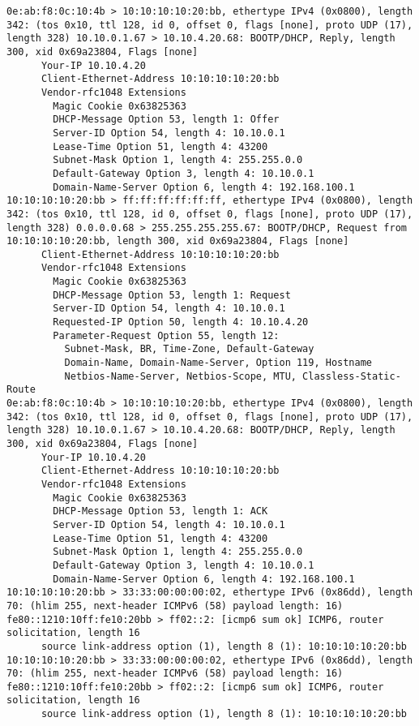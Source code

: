\documentclass[a4paper,12pt]{article}
\begin{document}
\begin{Verbatim}
0e:ab:f8:0c:10:4b > 10:10:10:10:20:bb, ethertype IPv4 (0x0800), length 342: (tos 0x10, ttl 128, id 0, offset 0, flags [none], proto UDP (17), length 328) 10.10.0.1.67 > 10.10.4.20.68: BOOTP/DHCP, Reply, length 300, xid 0x69a23804, Flags [none]
	  Your-IP 10.10.4.20
	  Client-Ethernet-Address 10:10:10:10:20:bb
	  Vendor-rfc1048 Extensions
	    Magic Cookie 0x63825363
	    DHCP-Message Option 53, length 1: Offer
	    Server-ID Option 54, length 4: 10.10.0.1
	    Lease-Time Option 51, length 4: 43200
	    Subnet-Mask Option 1, length 4: 255.255.0.0
	    Default-Gateway Option 3, length 4: 10.10.0.1
	    Domain-Name-Server Option 6, length 4: 192.168.100.1
10:10:10:10:20:bb > ff:ff:ff:ff:ff:ff, ethertype IPv4 (0x0800), length 342: (tos 0x10, ttl 128, id 0, offset 0, flags [none], proto UDP (17), length 328) 0.0.0.0.68 > 255.255.255.255.67: BOOTP/DHCP, Request from 10:10:10:10:20:bb, length 300, xid 0x69a23804, Flags [none]
	  Client-Ethernet-Address 10:10:10:10:20:bb
	  Vendor-rfc1048 Extensions
	    Magic Cookie 0x63825363
	    DHCP-Message Option 53, length 1: Request
	    Server-ID Option 54, length 4: 10.10.0.1
	    Requested-IP Option 50, length 4: 10.10.4.20
	    Parameter-Request Option 55, length 12: 
	      Subnet-Mask, BR, Time-Zone, Default-Gateway
	      Domain-Name, Domain-Name-Server, Option 119, Hostname
	      Netbios-Name-Server, Netbios-Scope, MTU, Classless-Static-Route
0e:ab:f8:0c:10:4b > 10:10:10:10:20:bb, ethertype IPv4 (0x0800), length 342: (tos 0x10, ttl 128, id 0, offset 0, flags [none], proto UDP (17), length 328) 10.10.0.1.67 > 10.10.4.20.68: BOOTP/DHCP, Reply, length 300, xid 0x69a23804, Flags [none]
	  Your-IP 10.10.4.20
	  Client-Ethernet-Address 10:10:10:10:20:bb
	  Vendor-rfc1048 Extensions
	    Magic Cookie 0x63825363
	    DHCP-Message Option 53, length 1: ACK
	    Server-ID Option 54, length 4: 10.10.0.1
	    Lease-Time Option 51, length 4: 43200
	    Subnet-Mask Option 1, length 4: 255.255.0.0
	    Default-Gateway Option 3, length 4: 10.10.0.1
	    Domain-Name-Server Option 6, length 4: 192.168.100.1
10:10:10:10:20:bb > 33:33:00:00:00:02, ethertype IPv6 (0x86dd), length 70: (hlim 255, next-header ICMPv6 (58) payload length: 16) fe80::1210:10ff:fe10:20bb > ff02::2: [icmp6 sum ok] ICMP6, router solicitation, length 16
	  source link-address option (1), length 8 (1): 10:10:10:10:20:bb
10:10:10:10:20:bb > 33:33:00:00:00:02, ethertype IPv6 (0x86dd), length 70: (hlim 255, next-header ICMPv6 (58) payload length: 16) fe80::1210:10ff:fe10:20bb > ff02::2: [icmp6 sum ok] ICMP6, router solicitation, length 16
	  source link-address option (1), length 8 (1): 10:10:10:10:20:bb

\end{Verbatim}
\end{document}
